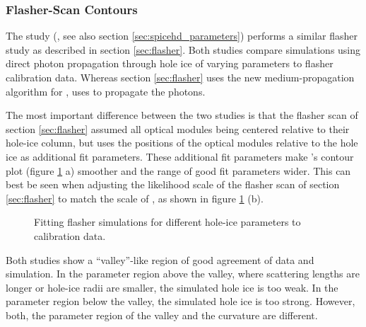 \subsubsection{ Flasher-Scan Contours}
\label{sec:spicehd_flasher_scan_contours}

The  study (, see also section \ref{sec:spicehd_parameters}) performs a similar flasher study as described in section \ref{sec:flasher}.
Both studies compare simulations using direct photon propagation through hole ice of varying parameters to flasher calibration data. Whereas section \ref{sec:flasher} uses the new medium-propagation algorithm for \clsim,  uses \ppc to propagate the photons. \cite{martinspicehddard}

The most important difference between the two studies is that the flasher scan of section \ref{sec:flasher} assumed all optical modules being centered relative to their hole-ice column, but  uses the positions of the optical modules relative to the hole ice as additional fit parameters. These additional fit parameters make 's contour plot (figure \ref{fig:ahCoHee4} a) smoother and the range of good fit parameters wider. This can best be seen when adjusting the likelihood scale of the flasher scan of section \ref{sec:flasher} to match the scale of , as shown in figure \ref{fig:ahCoHee4} (b).

\begin{figure}[htbp]
  \hfill
  \caption{Fitting flasher simulations for different hole-ice parameters to calibration data.}
  \label{fig:ahCoHee4}
\end{figure}

Both studies show a ``valley''-like region of good agreement of data and simulation. In the parameter region above the valley, where scattering lengths are longer or hole-ice radii are smaller, the simulated hole ice is too weak. In the parameter region below the valley, the simulated hole ice is too strong. However, both, the parameter region of the valley and the curvature are different.

